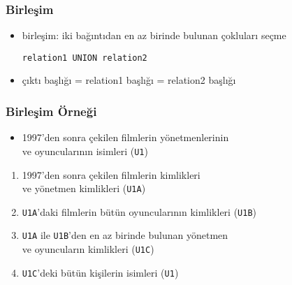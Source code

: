 \documentclass[dvipsnames]{beamer}
\theoremstyle{plain}
\begin{document}
\begin{frame}[fragile]
  \frametitle{Birleşim}

  \begin{itemize}
    \item \alert{birleşim}: iki bağıntıdan en az birinde bulunan çokluları seçme

    \begin{lstlisting}
relation1 UNION relation2
    \end{lstlisting}

    \medskip
  
    \item çıktı başlığı = relation1 başlığı = relation2 başlığı
  \end{itemize}
\end{frame}

\begin{frame}
  \frametitle{Birleşim Örneği}

    \begin{itemize}
      \item 1997'den sonra çekilen filmlerin yönetmenlerinin\\
        ve oyuncularının isimleri (\texttt{U1})
    \end{itemize}

    \pause
    \begin{enumerate}
      \item 1997'den sonra çekilen filmlerin kimlikleri\\
        ve yönetmen kimlikleri (\texttt{U1A})

      \item \texttt{U1A}'daki filmlerin bütün oyuncularının kimlikleri (\texttt{U1B})

      \item \texttt{U1A} ile \texttt{U1B}'den en az birinde bulunan yönetmen\\
        ve oyuncuların kimlikleri (\texttt{U1C})

      \item \texttt{U1C}'deki bütün kişilerin isimleri (\texttt{U1})
    \end{enumerate}
\end{frame}
\end{document}
